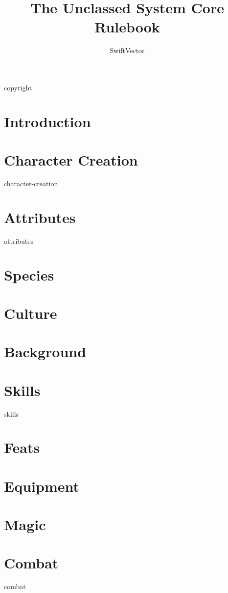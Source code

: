 \documentclass{book}
\title{The Unclassed System Core Rulebook}
\author{SwiftVector}
\begin{document}
\maketitle

\frontmatter

{copyright}

\tableofcontents

\mainmatter
\chapter{Introduction}


\chapter{Character Creation}
{character-creation}

\chapter{Attributes}\label{attributes}
{attributes}

\chapter{Species}\label{species}


\chapter{Culture}\label{culture}


\chapter{Background}\label{background}


\chapter{Skills}\label{skills}
{skills}

\chapter{Feats}\label{feats}


\chapter{Equipment}\label{equipment}


\chapter{Magic}\label{magic}


\chapter{Combat}\label{combat}
{combat}

\backmatter

\printindex

\glsaddallunused
\printglossary[type=\acronymtype]
\printglossary
\end{document}
